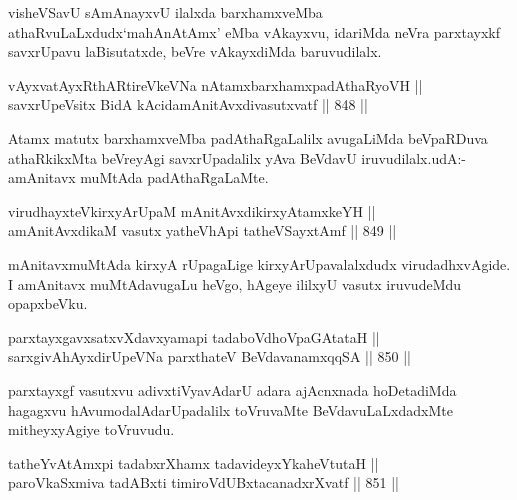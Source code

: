 \begin{artha}
visheVSavU sAmAnayxvU ilalxda barxhamxveMba athaRvuLaLxdudx\break `mahAnAtAmx' eMba vAkayxvu, idariMda neVra parxtayxkf savxrUpavu laBisutatxde, beVre vAkayxdiMda baruvudilalx.
\end{artha}


\begin{shl}
vAyxvatAyxRthARtireVkeVNa nA\s \s tamxbarxhamxpadAthaRyoVH || \\
savxrUpeV\s sitx BidA kAcidamAnitAvxdivasutxvatf \hfill || 848 ||  
\end{shl}

\begin{artha}
Atamx matutx barxhamxveMba padAthaRgaLalilx avugaLiMda beVpaRDuva athaRkikxMta beVreyAgi savxrUpadalilx yAva BeVdavU iruvudilalx.\break udA:-amAnitavx muMtAda padAthaRgaLaMte.
\end{artha}


\begin{shl}
virudhayxteV\s kirxyArUpaM mAnitAvxdikirxyAtamxkeYH || \\
amAnitAvxdikaM vasutx yatheVhApi tatheVSayxtAmf \hfill || 849 ||  
\end{shl}

\begin{artha}
mAnitavxmuMtAda kirxyA rUpagaLige kirxyArUpavalalxdudx virudadhxvAgide. I amAnitavx muMtAdavugaLu heVgo, hAgeye ililxyU vasutx iruvudeMdu opapxbeVku.
\end{artha}

\begin{shl}
parxtayxgavxsatxvXdavxyamapi tadaboVdhoVpaGAtataH || \\
sarxgivAhAyxdirUpeVNa parxthateV BeVdavanamxqqSA \hfill || 850 ||  
\end{shl}

\begin{artha}
parxtayxgf vasutxvu adivxtiVyavAdarU adara ajAcnxnada hoDetadiMda hagagxvu hAvumodalAdarUpadalilx toVruvaMte BeVda\-\break vuLaLxdadxMte mitheyxyAgiye toVruvudu.
\end{artha}

\begin{shl}
tatheYvA\s \s tAmx\s pi tadabxrXhamx tadavideyxYkaheVtutaH || \\
paroVkaSxmiva tadABxti timiroVdUBxtacanadxrXvatf \hfill || 851 ||  
\end{shl}

